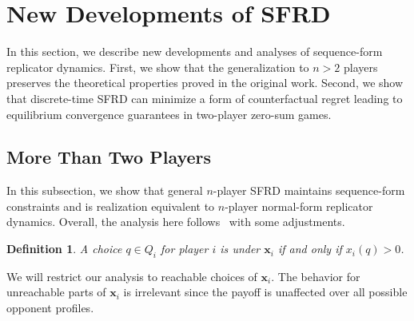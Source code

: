 \documentclass{aamas2014}
\newcommand{\bx}{\mathbf{x}}
\newcommand{\defword}[1]{\textbf{\boldmath{#1}}}
\newtheorem{definition}{Definition}
\begin{document}
\section{New Developments of SFRD}

In this section, we describe new developments and analyses of sequence-form replicator dynamics. 
First, we show that the generalization to $n > 2$ players preserves the theoretical properties proved in the original work. 
Second, we show that discrete-time SFRD can minimize a form of counterfactual regret leading to equilibrium convergence guarantees
in two-player zero-sum games. 


\subsection{More Than Two Players}

In this subsection, we show that general $n$-player SFRD maintains sequence-form constraints and is 
realization equivalent to $n$-player normal-form replicator dynamics. Overall, the analysis here follows~\cite{Gatti13Efficient}
with some adjustments. 

\begin{definition}
A choice $q \in Q_i$ for player $i$ is \defword{reachable} under $\bx_i$ if and only if $x_i(q) > 0$. 
\end{definition}

We will restrict our analysis to reachable choices of $\bx_i$. The behavior for unreachable parts of $\bx_i$ is 
irrelevant since the payoff is unaffected over all possible opponent profiles. 
\end{document}
